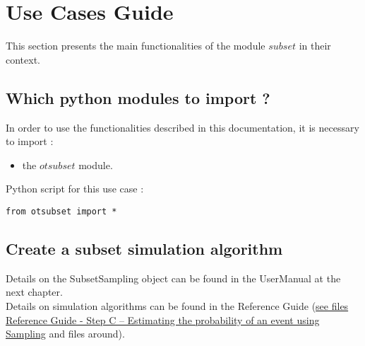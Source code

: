 % 




\section{Use Cases Guide}

This section presents the main functionalities of the module $subset$ in their context.



\subsection{Which python modules to import ?}

In order to use the functionalities described in this documentation, it is necessary to import  : 
\begin{itemize}
   \item the $otsubset$ module.
\end{itemize}

Python  script for this use case :
\begin{lstlisting}
from otsubset import *
\end{lstlisting}



\subsection{Create a subset simulation algorithm}

Details on the SubsetSampling object can be found in the UserManual at the next chapter.\\

Details on simulation algorithms can be found in the Reference Guide (\href{OpenTURNS_ReferenceGuide.pdf}{see files Reference Guide - Step C -- Estimating the probability of an event using Sampling} and files around).\\


